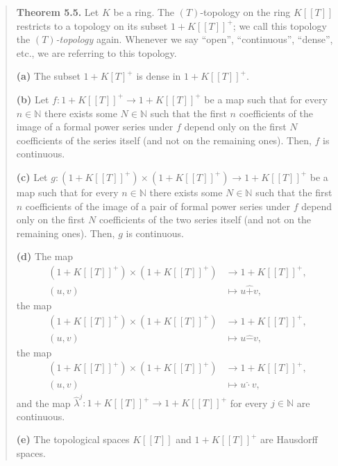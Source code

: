 \documentclass[numbers=enddot,12pt,final,onecolumn,notitlepage]{scrartcl}%
\begin{document}
\begin{quote}
\textbf{Theorem 5.5.} Let $K$ be a ring. The $\left(  T\right)  $-topology on
the ring $K\left[  \left[  T\right]  \right]  $ restricts to a topology on its
subset $1+K\left[  \left[  T\right]  \right]  ^{+}$; we call this topology the
$\left(  T\right)  $\textit{-topology} again. Whenever we say ``open'',
``continuous'', ``dense'', etc., we are referring to this topology.

\textbf{(a)} The subset $1+K\left[  T\right]  ^{+}$ is dense in $1+K\left[
\left[  T\right]  \right]  ^{+}$.

\textbf{(b)} Let $f:1+K\left[  \left[  T\right]  \right]  ^{+}\rightarrow
1+K\left[  \left[  T\right]  \right]  ^{+}$ be a map such that for every
$n\in\mathbb{N}$ there exists some $N\in\mathbb{N}$ such that the first $n$
coefficients of the image of a formal power series under $f$ depend only on
the first $N$ coefficients of the series itself (and not on the remaining
ones). Then, $f$ is continuous.

\textbf{(c)} Let $g:\left(  1+K\left[  \left[  T\right]  \right]  ^{+}\right)
\times\left(  1+K\left[  \left[  T\right]  \right]  ^{+}\right)
\rightarrow1+K\left[  \left[  T\right]  \right]  ^{+}$ be a map such that for
every $n\in\mathbb{N}$ there exists some $N\in\mathbb{N}$ such that the first
$n$ coefficients of the image of a pair of formal power series under $f$
depend only on the first $N$ coefficients of the two series itself (and not on
the remaining ones). Then, $g$ is continuous.

\textbf{(d)} The map%
\begin{align*}
\left(  1+K\left[  \left[  T\right]  \right]  ^{+}\right)  \times\left(
1+K\left[  \left[  T\right]  \right]  ^{+}\right)   &  \rightarrow1+K\left[
\left[  T\right]  \right]  ^{+},\\
\left(  u,v\right)   &  \mapsto u\widehat{+}v,
\end{align*}
the map%
\begin{align*}
\left(  1+K\left[  \left[  T\right]  \right]  ^{+}\right)  \times\left(
1+K\left[  \left[  T\right]  \right]  ^{+}\right)   &  \rightarrow1+K\left[
\left[  T\right]  \right]  ^{+},\\
\left(  u,v\right)   &  \mapsto u\widehat{-}v,
\end{align*}
the map%
\begin{align*}
\left(  1+K\left[  \left[  T\right]  \right]  ^{+}\right)  \times\left(
1+K\left[  \left[  T\right]  \right]  ^{+}\right)   &  \rightarrow1+K\left[
\left[  T\right]  \right]  ^{+},\\
\left(  u,v\right)   &  \mapsto u\widehat{\cdot}v,
\end{align*}
and the map $\widehat{\lambda}^{j}:1+K\left[  \left[  T\right]  \right]
^{+}\rightarrow1+K\left[  \left[  T\right]  \right]  ^{+}$ for every
$j\in\mathbb{N}$ are continuous.

\textbf{(e)} The topological spaces $K\left[  \left[  T\right]  \right]  $ and
$1+K\left[  \left[  T\right]  \right]  ^{+}$ are Hausdorff spaces.
\end{quote}
\end{document}
